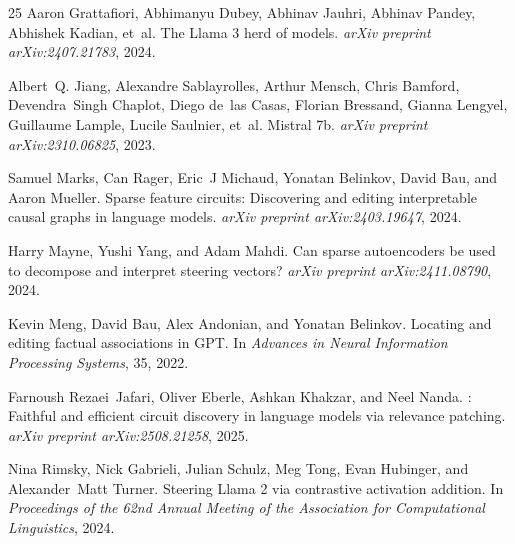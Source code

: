 \documentclass[11pt]{article}
\begin{document}
\begin{thebibliography}{25}
Aaron Grattafiori, Abhimanyu Dubey, Abhinav Jauhri, Abhinav Pandey, Abhishek
  Kadian, et~al.
\newblock The {Llama} 3 herd of models.
\newblock \emph{arXiv preprint arXiv:2407.21783}, 2024.

Albert~Q. Jiang, Alexandre Sablayrolles, Arthur Mensch, Chris Bamford,
  Devendra~Singh Chaplot, Diego de~las Casas, Florian Bressand, Gianna Lengyel,
  Guillaume Lample, Lucile Saulnier, et~al.
\newblock Mistral 7b.
\newblock \emph{arXiv preprint arXiv:2310.06825}, 2023.

Samuel Marks, Can Rager, Eric~J Michaud, Yonatan Belinkov, David Bau, and Aaron
  Mueller.
\newblock Sparse feature circuits: Discovering and editing interpretable causal
  graphs in language models.
\newblock \emph{arXiv preprint arXiv:2403.19647}, 2024.

Harry Mayne, Yushi Yang, and Adam Mahdi.
\newblock Can sparse autoencoders be used to decompose and interpret steering
  vectors?
\newblock \emph{arXiv preprint arXiv:2411.08790}, 2024.

Kevin Meng, David Bau, Alex Andonian, and Yonatan Belinkov.
\newblock Locating and editing factual associations in {GPT}.
\newblock In \emph{Advances in Neural Information Processing Systems}, 35, 2022.

Farnoush Rezaei~Jafari, Oliver Eberle, Ashkan Khakzar, and Neel Nanda.
: Faithful and efficient circuit discovery in language models
  via relevance patching.
\newblock \emph{arXiv preprint arXiv:2508.21258}, 2025.

Nina Rimsky, Nick Gabrieli, Julian Schulz, Meg Tong, Evan Hubinger, and
  Alexander~Matt Turner.
\newblock Steering {Llama} 2 via contrastive activation addition.
\newblock In \emph{Proceedings of the 62nd Annual Meeting of the Association
  for Computational Linguistics}, 2024.


\end{thebibliography}
\end{document}
